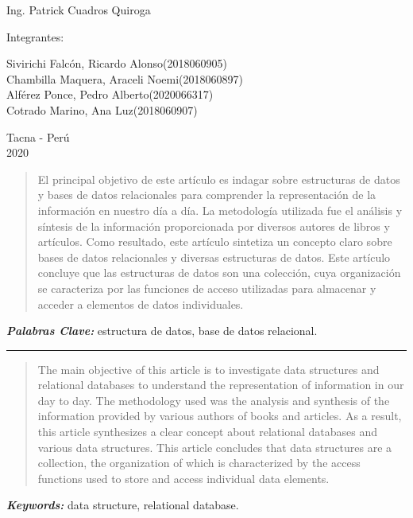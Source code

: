 \documentclass[12pt,letterpaper]{article}
\providecommand{\keywords}[1]
{
  \small	
  \textbf{\textit{Keywords: }} #1
}
\providecommand{\pclave}[1]
{
  \small	
  \textbf{\textit{Palabras Clave:}} #1
}
\begin{document}
\begin{titlepage}
\begin{center}
\vspace*{0.1in}
\begin{large}
 Ing. Patrick Cuadros Quiroga\\
\end{large}

\vspace*{0.2in}
\vspace*{0.1in}
\begin{large}
Integrantes: \\
\begin{flushleft}
Sivirichi Falcón, Ricardo Alonso\hfill(2018060905) \\
Chambilla Maquera, Araceli Noemi\hfill(2018060897)\\
Alférez Ponce, Pedro Alberto\hfill(2020066317)\\
Cotrado Marino, Ana Luz\hfill(2018060907)\\

\end{flushleft}
\end{large}

\vspace*{0.1in}
\begin{large}
Tacna - Perú\\
2020
\end{large}
\end{center}

\end{titlepage}

\begin{abstract}
El principal objetivo de este artículo es indagar sobre estructuras de datos y bases de datos relacionales para comprender la representación de la información en nuestro día a día.
La metodología utilizada fue el análisis y síntesis de la información proporcionada por diversos autores de libros y artículos. Como resultado, este artículo sintetiza un concepto claro sobre bases de datos relacionales y diversas estructuras de datos.
Este artículo concluye que las estructuras de datos son una colección, cuya organización se caracteriza por las funciones de acceso utilizadas para almacenar y acceder a elementos de datos individuales.
\end{abstract}
\pclave{estructura de datos, base de datos relacional.}

\begin{center}\rule{1\textwidth}{0.05mm} \end{center}

\begin{abstract}
The main objective of this article is to investigate data structures and relational databases to understand the representation of information in our day to day.
The methodology used was the analysis and synthesis of the information provided by various authors of books and articles. As a result, this article synthesizes a clear concept about relational databases and various data structures.
This article concludes that data structures are a collection, the organization of which is characterized by the access functions used to store and access individual data elements.
\end{abstract}
\keywords{data structure, relational database.}
\end{document}
